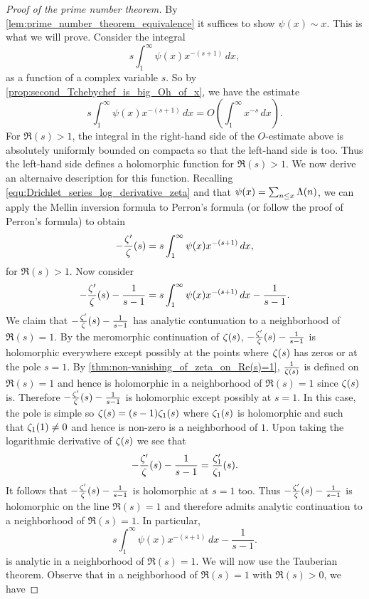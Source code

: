       \begin{proof}[Proof of the prime number theorem]
        By \cref{lem:prime_number_theorem_equivalence} it suffices to show $\psi(x) \sim x$. This is what we will prove. Consider the integral
        \[
          s\int_{1}^{\infty}\psi(x)x^{-(s+1)}\,dx,
        \]
        as a function of a complex variable $s$. So by \cref{prop:second_Tchebychef_is_big_Oh_of_x}, we have the estimate
        \[
          s\int_{1}^{\infty}\psi(x)x^{-(s+1)}\,dx = O\left(\int_{1}^{\infty}x^{-s}\,dx\right).
        \]
        For $\Re(s) > 1$, the integral in the right-hand side of the $O$-estimate above is absolutely uniformly bounded on compacta so that the left-hand side is too. Thus the left-hand side defines a holomorphic function for $\Re(s) > 1$. We now derive an alternaive description for this function. Recalling \cref{equ:Drichlet_series_log_derivative_zeta} and that $\psi(x) = \sum_{n \le x}\Lambda(n)$, we can apply the Mellin inversion formula to Perron's formula (or follow the proof of Perron's formula) to obtain
        \[
          -\frac{\zeta'}{\zeta}(s) = s\int_{1}^{\infty}\psi(x)x^{-(s+1)}\,dx,
        \]
        for $\Re(s) > 1$. Now consider
        \[
          -\frac{\zeta'}{\zeta}(s)-\frac{1}{s-1} = s\int_{1}^{\infty}\psi(x)x^{-(s+1)}\,dx-\frac{1}{s-1}.
        \]
        We claim that $-\frac{\zeta'}{\zeta}(s)-\frac{1}{s-1}$ has analytic contunuation to a neighborhood of $\Re(s) = 1$. By the meromorphic continuation of $\zeta(s)$, $-\frac{\zeta'}{\zeta}(s)-\frac{1}{s-1}$ is holomorphic everywhere except possibly at the points where $\zeta(s)$ has zeros or at the pole $s = 1$. By \cref{thm:non-vanishing_of_zeta_on_Re(s)=1}, $\frac{1}{\zeta(s)}$ is defined on $\Re(s) = 1$ and hence is holomorphic in a neighborhood of $\Re(s) = 1$ since $\zeta(s)$ is. Therefore $-\frac{\zeta'}{\zeta}(s)-\frac{1}{s-1}$ is holomorphic except possibly at $s = 1$. In this case, the pole is simple so $\zeta(s) = (s-1)\zeta_{1}(s)$ where $\zeta_{1}(s)$ is holomorphic and such that $\zeta_{1}(1) \neq 0$ and hence is non-zero is a neighborhood of $1$. Upon taking the logarithmic derivative of $\zeta(s)$ we see that
        \[
          -\frac{\zeta'}{\zeta}(s)-\frac{1}{s-1} = \frac{\zeta_{1}'}{\zeta_{1}}(s).
        \]
        It follows that $-\frac{\zeta'}{\zeta}(s)-\frac{1}{s-1}$ is holomorphic at $s = 1$ too. Thus $-\frac{\zeta'}{\zeta}(s)-\frac{1}{s-1}$ is holomorphic on the line $\Re(s) = 1$ and therefore admits analytic continuation to a neighborhood of $\Re(s) = 1$. In particular,
        \[
          s\int_{1}^{\infty}\psi(x)x^{-(s+1)}\,dx-\frac{1}{s-1}.
        \]
        is analytic in a neighborhood of $\Re(s) = 1$. We will now use the Tauberian theorem. Observe that in a neighborhood of $\Re(s) = 1$ with $\Re(s) > 0$, we have

\end{proof}
